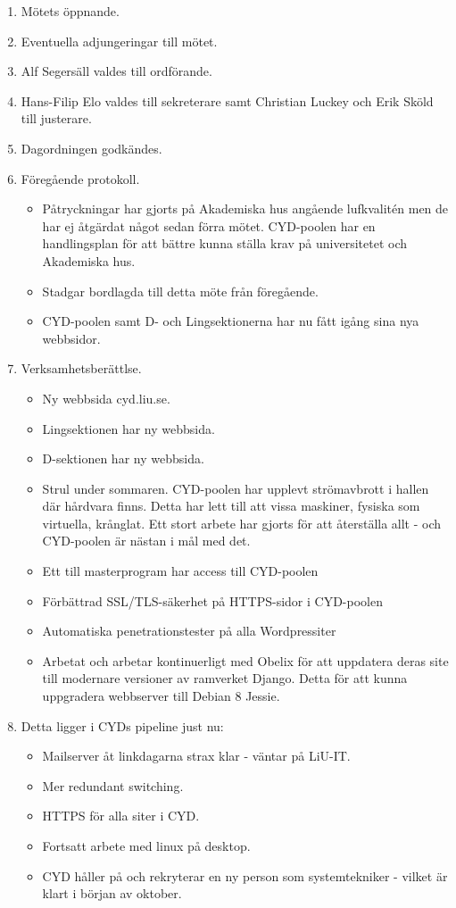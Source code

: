\documentclass[a4paper,12pt]{article}
\begin{document}
\begin{enumerate}
\item Mötets öppnande.
\item Eventuella adjungeringar till mötet.
\item Alf Segersäll valdes till ordförande.
\item Hans-Filip Elo valdes till sekreterare samt Christian Luckey och Erik Sköld till justerare.
\item Dagordningen godkändes.
\item Föregående protokoll.
  \begin{itemize}
  \item Påtryckningar har gjorts på Akademiska hus angående lufkvalitén men de har ej åtgärdat något sedan förra mötet. CYD-poolen har en handlingsplan för att bättre kunna ställa krav på universitetet och Akademiska hus.
  \item Stadgar bordlagda till detta möte från föregående.
  \item CYD-poolen samt D- och Lingsektionerna har nu fått igång sina nya webbsidor.
  \end{itemize}
\item Verksamhetsberättlse.
  \begin{itemize}
    \item Ny webbsida cyd.liu.se.
    \item Lingsektionen har ny webbsida.
    \item D-sektionen har ny webbsida.
    \item Strul under sommaren. CYD-poolen har upplevt strömavbrott i hallen där hårdvara finns. Detta har lett till att vissa maskiner, fysiska som virtuella, krånglat. Ett stort arbete har gjorts för att återställa allt - och CYD-poolen är nästan i mål med det.
    \item Ett till masterprogram har access till CYD-poolen
    \item Förbättrad SSL/TLS-säkerhet på HTTPS-sidor i CYD-poolen
    \item Automatiska penetrationstester på alla Wordpressiter
    \item Arbetat och arbetar kontinuerligt med Obelix för att uppdatera deras site till modernare versioner av ramverket Django. Detta för att kunna uppgradera webbserver till Debian 8 Jessie.
  \end{itemize}
\item Detta ligger i CYDs pipeline just nu:
  \begin{itemize}
    \item Mailserver åt linkdagarna strax klar - väntar på LiU-IT.
    \item Mer redundant switching.
    \item HTTPS för alla siter i CYD.
    \item Fortsatt arbete med linux på desktop.
    \item CYD håller på och rekryterar en ny person som systemtekniker - vilket är klart i början av oktober.
  \end{itemize}


\end{enumerate}
\end{document}
